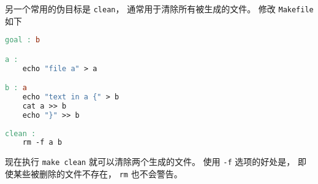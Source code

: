 另一个常用的伪目标是 \verb|clean|， 通常用于清除所有被生成的文件。 修改 \verb|Makefile| 如下
\begin{lstlisting}[language=makefile]
goal : b

a :
	echo "file a" > a

b : a
	echo "text in a {" > b
	cat a >> b
	echo "}" >> b
    
clean :
	rm -f a b
\end{lstlisting}
现在执行 \verb|make clean| 就可以清除两个生成的文件。 使用 \verb|-f| 选项的好处是， 即使某些被删除的文件不存在， \verb|rm| 也不会警告。
